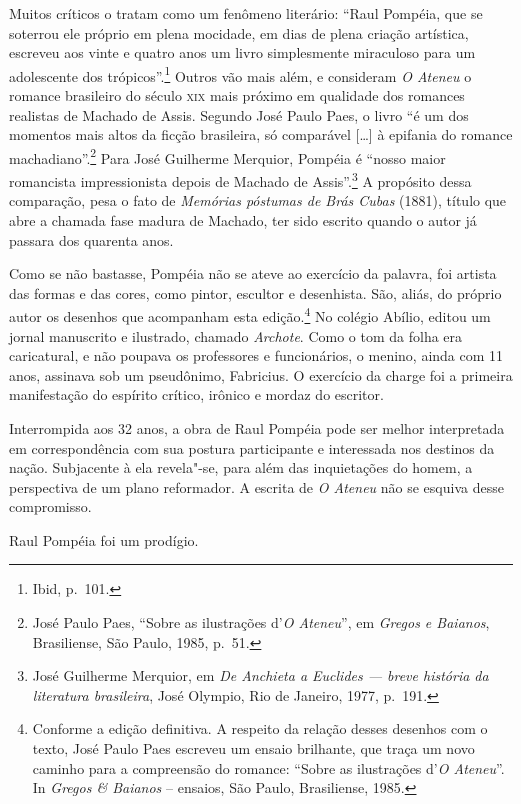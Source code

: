 Muitos críticos o tratam como um fenômeno literário:
``Raul Pompéia, que se soterrou ele próprio em plena mocidade, em dias
de plena criação artística, escreveu aos vinte e quatro anos um livro
simplesmente miraculoso para um adolescente dos trópicos''.\footnote{Ibid, p.~101.} 
Outros vão mais além, e consideram
\textit{O Ateneu} o romance brasileiro do
século \textsc{xix} mais próximo em qualidade dos romances realistas de Machado
de Assis. Segundo José Paulo Paes, o livro ``é um dos momentos mais
altos da ficção brasileira, só comparável [\ldots{}] à epifania do romance
machadiano''.\footnote{José Paulo Paes, ``Sobre as ilustrações
d'\textit{O Ateneu}'', em \textit{Gregos e Baianos}, Brasiliense, 
São Paulo, 1985, p.~51.} Para José Guilherme
Merquior, Pompéia é ``nosso maior romancista impressionista depois de
Machado de Assis''.\footnote{José Guilherme Merquior, em \textit{De
Anchieta a Euclides --- breve história da literatura brasileira}, José Olympio, 
Rio de Janeiro, 1977, p.~191.} A propósito
dessa comparação, pesa o fato de \textit{Memórias póstumas de
Brás Cubas} (1881), título que abre a chamada fase
madura de Machado, ter sido escrito quando o autor já passara dos
quarenta anos.


Como se não bastasse, Pompéia não se ateve ao exercício
da palavra, foi artista das formas e das cores, como pintor, escultor e
desenhista. São, aliás, do próprio autor os desenhos que acompanham
esta edição.\footnote{Conforme a edição definitiva. A respeito da
relação desses desenhos com o texto, José Paulo Paes escreveu um ensaio
brilhante, que traça um novo caminho para a compreensão do romance:
``Sobre as ilustrações d'\textit{O Ateneu}''. In \textit{Gregos \&
Baianos} -- ensaios,  São Paulo, Brasiliense, 1985.} 
No colégio Abílio, editou um jornal manuscrito e
ilustrado, chamado \textit{Archote}. Como o
tom da folha era caricatural, e não poupava os professores e
funcionários, o menino, ainda com 11 anos, assinava sob um pseudônimo,
Fabricius. O exercício da charge foi a primeira manifestação do
espírito crítico, irônico e mordaz do escritor.


Interrompida aos 32 anos, a obra de Raul Pompéia pode
ser melhor interpretada em correspondência com sua postura participante
e interessada nos destinos da nação. Subjacente à ela revela"-se, para
além das inquietações do homem, a perspectiva de um plano reformador. A
escrita de \textit{O Ateneu} não se esquiva desse compromisso.

Raul Pompéia foi um prodígio. 


